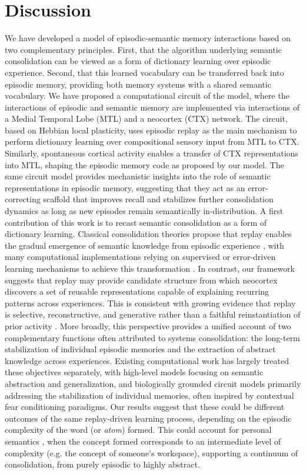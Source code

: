 \documentclass{article}
\begin{document}
\section*{Discussion}
We have developed a model of episodic-semantic memory interactions based on two complementary principles. First, that the algorithm underlying semantic consolidation can be viewed as a form of dictionary learning over episodic experience. Second, that this learned vocabulary can be transferred back into episodic memory, providing both memory systems with a shared semantic vocabulary. We have proposed a computational circuit of the model, where the interactions of episodic and semantic memory are implemented via interactions of a Medial Temporal Lobe (MTL) and a neocortex (CTX) network. The circuit, based on Hebbian local plasticity, uses episodic replay as the main mechanism to perform dictionary learning over compositional sensory input from MTL to CTX. Similarly, spontaneous cortical activity enables a transfer of CTX representations into MTL, shaping the episodic memory code as proposed by our model. The same circuit model provides mechanistic insights into the role of semantic representations in episodic memory, suggesting that they act as an error-correcting scaffold that improves recall and stabilizes further consolidation dynamics as long as new episodes remain semantically in-distribution.
\newline\newline
A first contribution of this work is to recast semantic consolidation as a form of dictionary learning. Classical consolidation theories propose that replay enables the gradual emergence of semantic knowledge from episodic experience , with many computational implementations relying on supervised or error-driven learning mechanisms to achieve this transformation . In contrast, our framework suggests that replay may provide candidate structure from which neocortex discovers a set of reusable representations capable of explaining recurring patterns across experiences. This is consistent with growing evidence that replay is selective, reconstructive, and generative rather than a faithful reinstantiation of prior activity . More broadly, this perspective provides a unified account of two complementary functions often attributed to systems consolidation: the long-term stabilization of individual episodic memories and the extraction of abstract knowledge across experiences. Existing computational work has largely treated these objectives separately, with high-level models focusing on semantic abstraction and generalization, and biologically grounded circuit models primarily addressing the stabilization of individual memories, often inspired by contextual fear conditioning paradigms. Our results suggest that these could be different outcomes of the same replay-driven learning process, depending on the episodic complexity of the word (or \textit{atom}) formed. This could account for personal semantics , when the concept formed corresponds to an intermediate level of complexity (e.g. the concept of someone's workspace), supporting a continuum of consolidation, from purely episodic to highly abstract.
\end{document}
